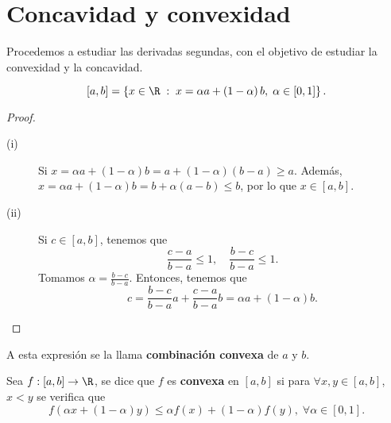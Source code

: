\section{Concavidad y convexidad}
Procedemos a estudiar las derivadas segundas, con el objetivo de estudiar la convexidad y la concavidad.
\begin{flema}[]
	\normalfont
	\[ \left[a,b\right] = \left\{ x \in \R \; : \; x = \alpha a + \left(1- \alpha \right)b, \; \alpha \in \left[0,1\right] \right\}  .\]
\end{flema}
\begin{proof}
\begin{description}
	\item[(i)] Si $\displaystyle x = \alpha a + \left(1- \alpha \right)b = a + \left(1 -\alpha \right)\left(b - a\right) \geq a $. Además, $\displaystyle x = \alpha a + \left(1- \alpha \right)b = b + \alpha \left(a- b\right) \leq b $, por lo que $\displaystyle x \in [a,b] $.
	\item[(ii)] Si $\displaystyle c \in \left[a,b\right]  $, tenemos que 
		\[ \frac{c-a}{b - a} \leq 1, \quad \frac{b-c}{b-a} \leq 1 .\]
		Tomamos $\displaystyle \alpha = \frac{b-c}{b-a} $. Entonces, tenemos que 
		\[c = \frac{b-c}{b-a}a + \frac{c-a}{b-a}b = \alpha a + \left(1-\alpha \right)b .\]		
\end{description}
\end{proof}
\begin{observation}
\normalfont A esta expresión se la llama \textbf{combinación convexa}  de $\displaystyle a $ y $\displaystyle b $.
\end{observation}
\begin{fdefinition}[]
	\normalfont Sea $\displaystyle f : [a,b] \to \R $, se dice que $\displaystyle f $ es \textbf{convexa} en $\displaystyle [a,b]  $ si para $\displaystyle \forall x,y \in [a,b] $, $\displaystyle x < y $ se verifica que 
	\[f\left(\alpha x + \left(1-\alpha \right)y \right) \leq \alpha f\left(x\right) + \left(1-\alpha \right)f\left(y\right), \; \forall \alpha \in \left[0,1\right]  .\]
\end{fdefinition}
